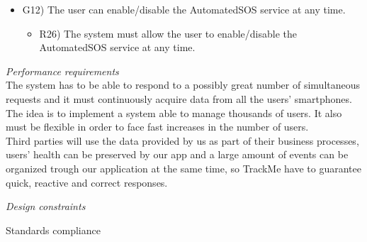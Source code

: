 \documentclass{article}
\begin{document}
\begin{legal}
\begin{legal}
\begin{legal}
\begin{itemize}
{\begin{itemize}
					\end{itemize}
				}
				\item G12) The user can enable/disable the AutomatedSOS service at any time.\\
				{\normalfont
					\begin{itemize}
					\item R26) The system must allow the user to enable/disable the AutomatedSOS service at any time.\\
					\end{itemize}
				}
				\end{itemize}
			\end{legal}
    		
		\item \textit{Performance requirements}\\
			{\normalfont
The system has to be able to respond to a possibly great number of simultaneous requests and it must continuously acquire data from all the users' smartphones. The idea is to implement a system able to manage thousands of users. It also must be flexible in order to face fast increases in the number of users.\\
Third parties will use the data provided by us as part of their business processes, users' health can be preserved by our app and a large amount of events can be organized trough our application at the same time, so TrackMe have to guarantee quick, reactive and correct responses.
			}
		\item \textit{Design constraints}\\
			\begin{legal}
			\item Standards compliance\\
			\begin{itemize}
			\end{itemize}
	

\end{legal}
\end{legal}
\end{legal}
\end{document}
